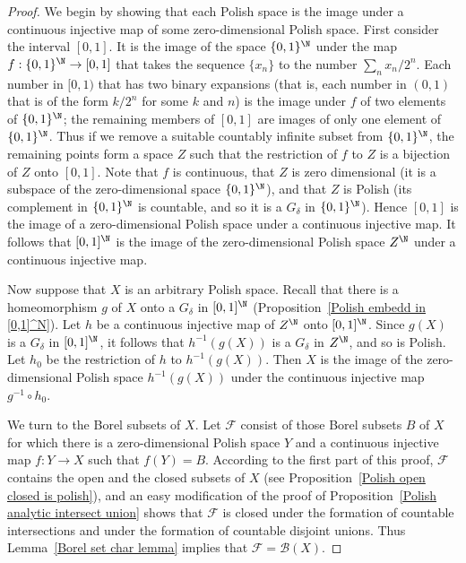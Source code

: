 \begin{proof}
We begin by showing that each Polish space is the image under a continuous injective map of some zero-dimensional Polish space. First consider the interval $[0,1]$. It is the image of the space $\{0,1\}^\N$ under the map $f:\{0,1\}^\N\to[0,1]$ that takes the sequence $\{x_n\}$ to the number $\sum_nx_n/2^n$. Each number in $[0,1)$ that has two binary expansions (that is, each number in $(0,1)$ that is of the form $k/2^n$ for some $k$ and $n$) is the image under $f$ of two elements of $\{0,1\}^\N$; the remaining members of $[0,1]$ are images of only one element of $\{0,1\}^\N$. Thus if we remove a suitable countably infinite subset from $\{0,1\}^\N$, the remaining points form a space $Z$ such that the restriction of $f$ to $Z$ is a bijection of $Z$ onto $[0,1]$. Note that $f$ is continuous, that $Z$ is zero dimensional (it is a subspace of the zero-dimensional space $\{0,1\}^\N$), and that $Z$ is Polish (its complement in $\{0,1\}^\N$ is countable, and so it is a $G_\delta$ in $\{0,1\}^\N$). Hence $[0,1]$ is the image of a zero-dimensional Polish space under a continuous injective map. It follows that $[0,1]^\N$ is the image of the zero-dimensional Polish space $Z^\N$ under a continuous injective map.\par
Now suppose that $X$ is an arbitrary Polish space. Recall that there is a homeomorphism $g$ of $X$ onto a $G_\delta$ in $[0,1]^\N$ (Proposition~\ref{Polish embedd in [0,1]^N}). Let $h$ be a continuous injective map of $Z^\N$ onto $[0,1]^\N$. Since $g(X)$ is a $G_\delta$ in $[0,1]^\N$, it follows that $h^{-1}(g(X))$ is a $G_\delta$ in $Z^\N$, and so is Polish. Let $h_0$ be the restriction of $h$ to $h^{-1}(g(X))$. Then $X$ is the image of the zero-dimensional Polish space $h^{-1}(g(X))$ under the continuous injective map $g^{-1}\circ h_0$.\par
We turn to the Borel subsets of $X$. Let $\mathcal{F}$ consist of those Borel subsets $B$ of $X$ for which there is a zero-dimensional Polish space $Y$ and a continuous injective map $f:Y\to X$ such that $f(Y)=B$. According to the first part of this proof, $\mathcal{F}$ contains the open and the closed subsets of $X$ (see Proposition~\ref{Polish open closed is polish}), and an easy modification of the proof of Proposition~\ref{Polish analytic intersect union} shows that $\mathscr{F}$ is closed under the formation of countable intersections and under the formation of countable disjoint unions. Thus Lemma~\ref{Borel set char lemma} implies that $\mathcal{F}=\mathcal{B}(X)$.
\end{proof}
